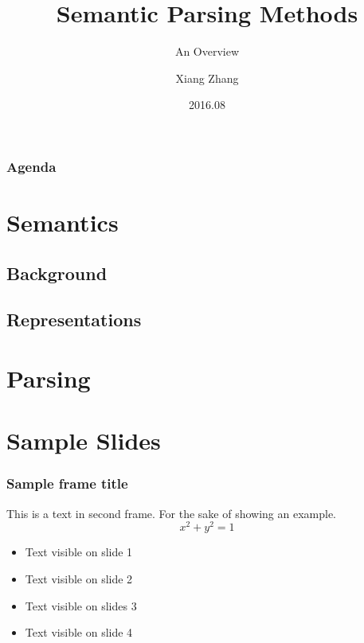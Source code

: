\documentclass{beamer}
\title[]{Semantic Parsing Methods}
\subtitle{An Overview}
\author {Xiang Zhang}
\institute {
    NLPR\\
    Institute of Automation
}
\date{2016.08}
\begin{document}
\frame{\titlepage}

\begin{frame}
\frametitle{Agenda}
\tableofcontents[hideallsubsections]
\end{frame}


\section{Semantics}

\subsection{Background}

\begin{frame}
\end{frame}

\subsection{Representations}

\section{Parsing}

\begin{frame}
\end{frame}

\section{Sample Slides}

\begin{frame}
    \frametitle{Sample frame title}
    This is a text in second frame. For the sake of showing an example.
    \[
        x^2 + y^2 = 1
    \]

    \begin{itemize}
        \item <1-> Text visible on slide 1
        \item <2-> Text visible on slide 2
        \item <3> Text visible on slides 3
        \item <4-> Text visible on slide 4
    \end{itemize}

\end{frame}
\end{document}
